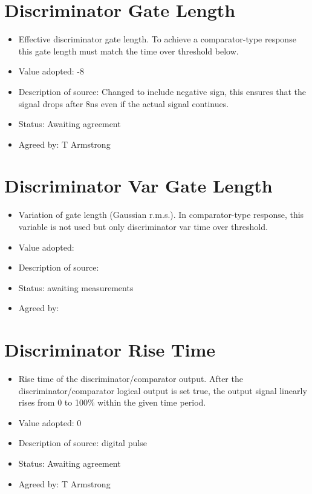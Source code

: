 \documentclass[GCT,short]{gct}
\begin{document}
\section{Discriminator Gate Length}
\begin{itemize}
\item Effective discriminator gate length. To achieve a comparator-type response this gate length must match the time over threshold below.
\item Value adopted: -8 
\item Description of source: Changed to include negative sign, this ensures that the signal drops after 8ns even if the actual signal continues.
\item Status: \color{orange}Awaiting agreement\color{black}
\item Agreed by: T Armstrong
\end{itemize}


\section{Discriminator Var Gate Length}
\begin{itemize}
\item Variation of gate length (Gaussian r.m.s.). In comparator-type response, this variable is not used but only discriminator var time over threshold.
\item Value adopted: 
\item Description of source: 
\item Status: \color{red}awaiting measurements\color{black}
\item Agreed by: 
\end{itemize}


\section{Discriminator Rise Time}
\begin{itemize}
\item Rise time of the discriminator/comparator output. After the discriminator/comparator logical output is set true, the output signal linearly rises from 0 to 100\% within the given time period.
\item Value adopted: 0
\item Description of source: digital pulse
\item Status: \color{orange}Awaiting agreement\color{black}
\item Agreed by: T Armstrong
\end{itemize}
\end{document}
